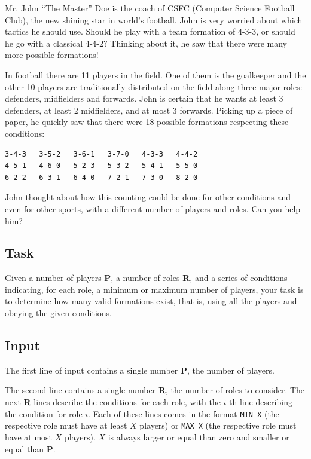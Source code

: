 \documentclass[11pt]{report}
\begin{document}
Mr. John ``The Master'' Doe is the coach of CSFC (Computer Science
Football Club), the new shining star in world's football. John is very
worried about which tactics he should use. Should he play with a team
formation of 4-3-3, or should he go with a classical 4-4-2? Thinking
about it, he saw that there were many more possible formations!

In football there are 11 players in the field. One of them is the
goalkeeper and the other 10 players are traditionally distributed on
the field along three major roles: defenders,
midfielders and forwards. John is certain that he wants at least 3
defenders, at least 2 midfielders, and at most 3 forwards. Picking up a
piece of paper, he quickly saw that there were 18 possible
formations respecting these conditions:

\begin{verbatim}
3-4-3   3-5-2   3-6-1   3-7-0   4-3-3   4-4-2
4-5-1   4-6-0   5-2-3   5-3-2   5-4-1   5-5-0
6-2-2   6-3-1   6-4-0   7-2-1   7-3-0   8-2-0
\end{verbatim}

John thought about how this counting could be done for other
conditions and even for other sports, with a different number of
players and roles. Can you help him?

\subsection*{Task}

Given a number of players {\bf P}, a number of roles {\bf R}, and a
series of conditions indicating, for each role, a minimum or maximum
number of players, your task is to determine how many valid formations
exist, that is, using all the players and obeying the given conditions.

\subsection*{Input}

The first line of input contains a single number {\bf P}, the number of players.

The second line contains a single number {\bf R}, the number of roles
to consider. The next {\bf R} lines describe the conditions for each
role, with the $i$-th line describing the condition for role $i$. Each
of these lines comes in the format {\tt MIN X} (the respective role
must have at least $X$ players) or {\tt MAX X} (the respective role
must have at most $X$ players). $X$ is always larger or equal than
zero and smaller or equal than {\bf P}.
\end{document}
